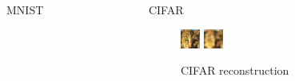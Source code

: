 \documentclass[final]{beamer}
\newlength{\onecolwid}
\newlength{\threecolwid}
\begin{document}
\begin{frame}[t]
\begin{columns}[t]
\begin{column}{\threecolwid}
\begin{columns}[t, totalwidth=\threecolwid]
\begin{column}{\onecolwid}
\begin{block}{MNIST}
\end{block}
\end{column}
\begin{column}{\onecolwid}
\begin{block}{CIFAR}
\begin{figure}
\includegraphics[width=0.5\linewidth]{graphics/cifar_image.png}
\includegraphics[width=0.5\linewidth]{graphics/cifar_reconstruction.png}

\caption{CIFAR reconstruction}
\end{figure}
\end{block}
\end{column}


\end{columns}
\end{column}
\end{columns}
\end{frame}
\end{document}
